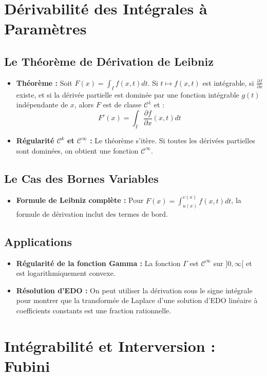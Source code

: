 \documentclass[12pt, a4paper, parskip=full]{report}
\theoremstyle{agregstyle}
\begin{document}
\section{Dérivabilité des Intégrales à Paramètres}
\subsection{Le Théorème de Dérivation de Leibniz}
\begin{itemize}
    \item \textbf{Théorème :} Soit $F(x) = \int_I f(x,t)dt$. Si $t \mapsto f(x,t)$ est intégrable, si $\frac{\partial f}{\partial x}$ existe, et si la dérivée partielle est dominée par une fonction intégrable $g(t)$ indépendante de $x$, alors $F$ est de classe $\mathcal{C}^1$ et :
    $$ F'(x) = \int_I \frac{\partial f}{\partial x}(x,t) dt $$
    \item \textbf{Régularité $\mathcal{C}^k$ et $\mathcal{C}^\infty$ :} Le théorème s'itère. Si toutes les dérivées partielles sont dominées, on obtient une fonction $\mathcal{C}^\infty$.
\end{itemize}
\subsection{Le Cas des Bornes Variables}
\begin{itemize}
    \item \textbf{Formule de Leibniz complète :} Pour $F(x) = \int_{u(x)}^{v(x)} f(x,t)dt$, la formule de dérivation inclut des termes de bord.
\end{itemize}
\subsection{Applications}
\begin{itemize}
    \item \textbf{Régularité de la fonction Gamma :} La fonction $\Gamma$ est $\mathcal{C}^\infty$ sur $]0, \infty[$ et est logarithmiquement convexe.
    \item \textbf{Résolution d'EDO :} On peut utiliser la dérivation sous le signe intégrale pour montrer que la transformée de Laplace d'une solution d'EDO linéaire à coefficients constants est une fraction rationnelle.
\end{itemize}

\section{Intégrabilité et Interversion : Fubini}
\end{document}
